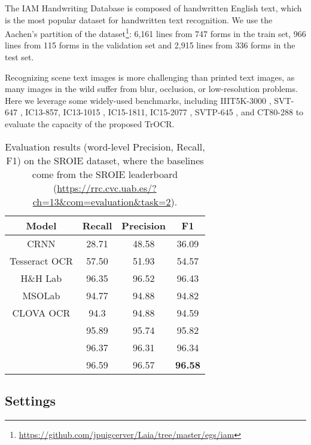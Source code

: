 \documentclass[letterpaper]{article} \usepackage{aaai23}  \usepackage{times}  \usepackage{helvet}  \usepackage{courier}  \usepackage[hyphens]{url}  \usepackage{graphicx} \urlstyle{rm} \def\UrlFont{\rm}  \usepackage{natbib}  \usepackage{caption} \frenchspacing  \setlength{\pdfpagewidth}{8.5in} \setlength{\pdfpageheight}{11in} \usepackage{algorithm}
\begin{document}
The IAM Handwriting Database is composed of handwritten English text, which is the most popular dataset for handwritten text recognition. We use the Aachen's partition of the dataset\footnote{\tiny\url{https://github.com/jpuigcerver/Laia/tree/master/egs/iam}}: 6,161 lines from 747 forms in the train set, 966 lines from 115 forms in the validation set and 2,915 lines from 336 forms in the test set.

Recognizing scene text images is more challenging than printed text images, as many images in the wild suffer from blur, occlusion, or low-resolution problems. Here we leverage some widely-used benchmarks, including IIIT5K-3000 \cite{mishra2012top}, SVT-647 \cite{wang2011end}, IC13-857, IC13-1015 \cite{karatzas2013icdar}, IC15-1811, IC15-2077 \cite{karatzas2015icdar}, SVTP-645 \cite{phan2013recognizing}, and CT80-288 \cite{risnumawan2014robust} to evaluate the capacity of the proposed TrOCR.



\begin{table}[ht]
\centering
\begin{tabular}{cccc}
\hline
\textbf{Model} & \textbf{Recall} & \textbf{Precision} & \textbf{F1} \\ \hline
CRNN            & 28.71              & 48.58          & 36.09         \\
Tesseract OCR   & 57.50              & 51.93           & 54.57       \\ \hline
H\&H Lab & 96.35           & 96.52              & 96.43       \\
MSOLab   & 94.77           & 94.88              & 94.82       \\
CLOVA OCR & 94.3            & 94.88              & 94.59       \\ \hline

     & 95.89           & 95.74              & 95.82       \\
      & 96.37           & 96.31              & 96.34       \\
     & 96.59           & 96.57              & \textbf{96.58}       \\
\hline
\end{tabular}
\caption{Evaluation results (word-level Precision, Recall, F1) on the SROIE dataset, where the baselines come from the SROIE leaderboard (\url{https://rrc.cvc.uab.es/?ch=13&com=evaluation&task=2}).}
\label{tab:sroie}
\end{table}


\subsection{Settings}
\end{document}
